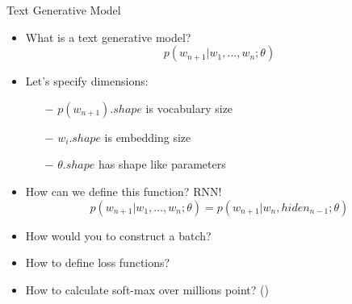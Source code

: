 \documentclass{beamer}
\begin{document}
\begin{frame}{Text Generative Model}
	\begin{itemize}
		\item What is a text generative model?
			$$p(w_{n+1}|w_1, \dots, w_n; \theta)$$
		\item Let's specify dimensions:
		\begin{itemize}
			\item[$-$] $p(w_{n+1}).shape$  is vocabulary size
			\item[$-$] $w_i.shape$ is embedding size
			\item[$-$]  $\theta.shape$ has shape like parameters
		\end{itemize}
		\item How can we define this function? RNN!
		$$p(w_{n+1}|w_1, \dots, w_n; \theta) = p(w_{n+1}|w_n, hiden_{n-1}; \theta)$$
	\end{itemize}
	 	\begin{tcolorbox}[enhanced,size=fbox,fontupper=\large\bfseries, colback=black!80, colframe=black!80]
	 		\begin{center}
	 			\text{\textcolor{white}{But, there are several technical problems to apply it}}
	 		\end{center}
	 	\end{tcolorbox}
	 	\begin{itemize}
	 		\item How would you to construct a batch?
	 		\item How to define loss functions?
	 		\item How to calculate soft-max over millions point? ()
	 	\end{itemize}
\end{frame}
\end{document}

